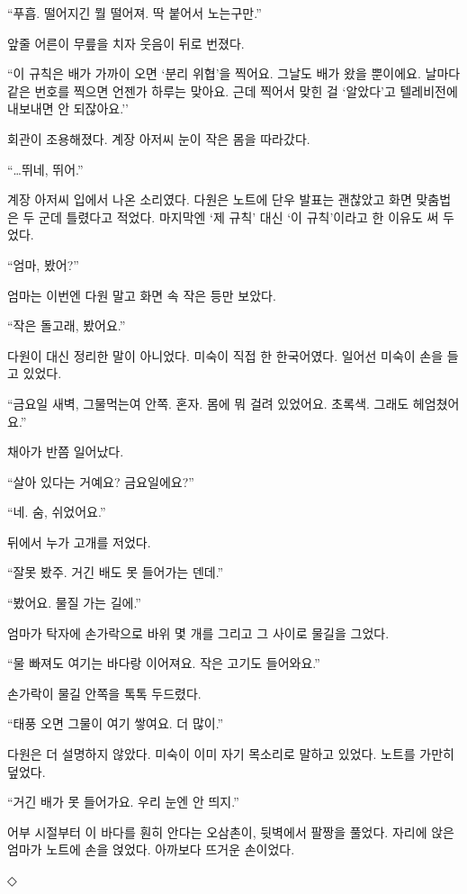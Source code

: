 \documentclass[
  korean,
  letterpaper,
  twoside,
  open=any,
  fontsize=12.5pt,
  headings=small]{scrbook}
\begin{document}
``푸흡. 떨어지긴 뭘 떨어져. 딱
붙어서 노는구만.''

앞줄 어른이 무릎을 치자 웃음이
뒤로 번졌다.

``이 규칙은 배가 가까이 오면
`분리 위협'을 찍어요. 그날도
배가 왔을 뿐이에요. 날마다
같은 번호를 찍으면 언젠가
하루는 맞아요. 근데 찍어서
맞힌 걸 `알았다'고 텔레비전에
내보내면 안 되잖아요.''

회관이 조용해졌다. 계장 아저씨
눈이 작은 몸을 따라갔다.

``\ldots 뛰네, 뛰어.''

계장 아저씨 입에서 나온
소리였다. 다원은 노트에 단우
발표는 괜찮았고 화면 맞춤법은
두 군데 틀렸다고 적었다.
마지막엔 `제 규칙' 대신 `이
규칙'이라고 한 이유도 써
두었다.

``엄마, 봤어?''

엄마는 이번엔 다원 말고 화면
속 작은 등만 보았다.

``작은 돌고래, 봤어요.''

다원이 대신 정리한 말이
아니었다. 미숙이 직접 한
한국어였다. 일어선 미숙이 손을
들고 있었다.

``금요일 새벽, 그물먹는여
안쪽. 혼자. 몸에 뭐 걸려
있었어요. 초록색. 그래도
헤엄쳤어요.''

채아가 반쯤 일어났다.

``살아 있다는 거예요?
금요일에요?''

``네. 숨, 쉬었어요.''

뒤에서 누가 고개를 저었다.

``잘못 봤주. 거긴 배도 못
들어가는 덴데.''

``봤어요. 물질 가는 길에.''

엄마가 탁자에 손가락으로 바위
몇 개를 그리고 그 사이로
물길을 그었다.

``물 빠져도 여기는 바다랑
이어져요. 작은 고기도
들어와요.''

손가락이 물길 안쪽을 톡톡
두드렸다.

``태풍 오면 그물이 여기
쌓여요. 더 많이.''

다원은 더 설명하지 않았다.
미숙이 이미 자기 목소리로
말하고 있었다. 노트를 가만히
덮었다.

``거긴 배가 못 들어가요. 우리
눈엔 안 띄지.''

어부 시절부터 이 바다를 훤히
안다는 오삼촌이, 뒷벽에서
팔짱을 풀었다. 자리에 앉은
엄마가 노트에 손을 얹었다.
아까보다 뜨거운 손이었다.

\begin{center}◇\end{center}\nopagebreak
\end{document}
